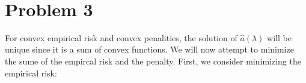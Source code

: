 \documentclass[11pt]{article}
\begin{document}
\begin{center}

\ \\
\end{center}


\section*{Problem 3}

\noindent
For convex empirical risk and convex penalities, the solution of 
$\hat{a}(\lambda)$ will be unique since it is a sum of convex functions. We 
will now attempt to minimize the sume of the empircal risk and the penalty. 
First, we consider minimizing the empirical risk:
\end{document}

